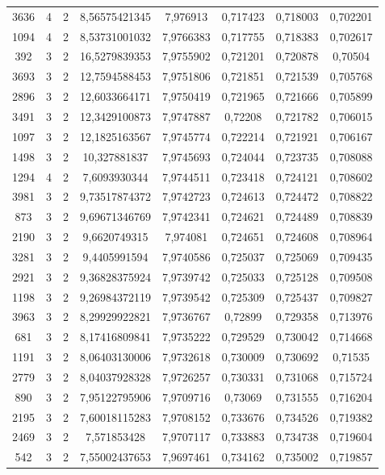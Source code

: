 \begin{longtable}{|c|c|c|c|c|c|c|c|}
3636 & 4 & 2 & 8,56575421345 & 7,976913 & 0,717423 & 0,718003 & 0,702201 \\
1094 & 4 & 2 & 8,53731001032 & 7,9766383 & 0,717755 & 0,718383 & 0,702617 \\
392 & 3 & 2 & 16,5279839353 & 7,9755902 & 0,721201 & 0,720878 & 0,70504 \\
3693 & 3 & 2 & 12,7594588453 & 7,9751806 & 0,721851 & 0,721539 & 0,705768 \\
2896 & 3 & 2 & 12,6033664171 & 7,9750419 & 0,721965 & 0,721666 & 0,705899 \\
3491 & 3 & 2 & 12,3429100873 & 7,9747887 & 0,72208 & 0,721782 & 0,706015 \\
1097 & 3 & 2 & 12,1825163567 & 7,9745774 & 0,722214 & 0,721921 & 0,706167 \\
1498 & 3 & 2 & 10,327881837 & 7,9745693 & 0,724044 & 0,723735 & 0,708088 \\
1294 & 4 & 2 & 7,6093930344 & 7,9744511 & 0,723418 & 0,724121 & 0,708602 \\
3981 & 3 & 2 & 9,73517874372 & 7,9742723 & 0,724613 & 0,724472 & 0,708822 \\
873 & 3 & 2 & 9,69671346769 & 7,9742341 & 0,724621 & 0,724489 & 0,708839 \\
2190 & 3 & 2 & 9,6620749315 & 7,974081 & 0,724651 & 0,724608 & 0,708964 \\
3281 & 3 & 2 & 9,4405991594 & 7,9740586 & 0,725037 & 0,725069 & 0,709435 \\
2921 & 3 & 2 & 9,36828375924 & 7,9739742 & 0,725033 & 0,725128 & 0,709508 \\
1198 & 3 & 2 & 9,26984372119 & 7,9739542 & 0,725309 & 0,725437 & 0,709827 \\
3963 & 3 & 2 & 8,29929922821 & 7,9736767 & 0,72899 & 0,729358 & 0,713976 \\
681 & 3 & 2 & 8,17416809841 & 7,9735222 & 0,729529 & 0,730042 & 0,714668 \\
1191 & 3 & 2 & 8,06403130006 & 7,9732618 & 0,730009 & 0,730692 & 0,71535 \\
2779 & 3 & 2 & 8,04037928328 & 7,9726257 & 0,730331 & 0,731068 & 0,715724 \\
890 & 3 & 2 & 7,95122795906 & 7,9709716 & 0,73069 & 0,731555 & 0,716204 \\
2195 & 3 & 2 & 7,60018115283 & 7,9708152 & 0,733676 & 0,734526 & 0,719382 \\
2469 & 3 & 2 & 7,571853428 & 7,9707117 & 0,733883 & 0,734738 & 0,719604 \\
542 & 3 & 2 & 7,55002437653 & 7,9697461 & 0,734162 & 0,735002 & 0,719857 \\

\end{longtable}
